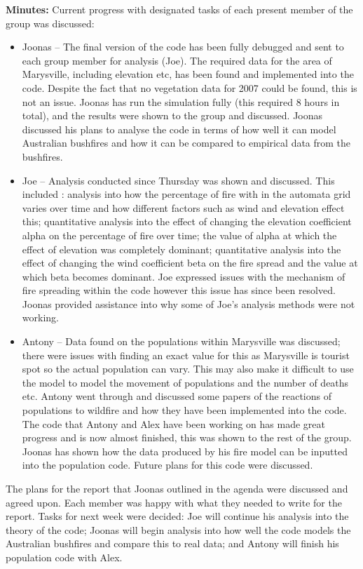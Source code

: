 \textbf{Minutes:}
Current progress with designated tasks of each present member of the group was discussed:
\begin{itemize}
    \item Joonas – The final version of the code has been fully debugged and sent to each group member for analysis (Joe). The required data for the area of Marysville, including elevation etc, has been found and implemented into the code.  Despite the fact that no vegetation data for 2007 could be found, this is not an issue. Joonas has run the simulation fully (this required 8 hours in total), and the results were shown to the group and discussed. Joonas discussed his plans to analyse the code in terms of how well it can model Australian bushfires and how it can be compared to empirical data from the bushfires.
    \item Joe – Analysis conducted since Thursday was shown and discussed. This included : analysis into how the percentage of fire with in the automata grid varies over time and how different factors such as wind and elevation effect this; quantitative analysis into the effect of changing the elevation coefficient alpha on the percentage of fire over time; the value of alpha at which the effect of elevation was completely dominant; quantitative analysis into the effect of changing the wind coefficient beta on the fire spread and the value at which beta becomes dominant. Joe expressed issues with the mechanism of fire spreading within the code however this issue has since been resolved. Joonas provided assistance into why some of Joe’s analysis methods were not working.
    \item Antony – Data found on the populations within Marysville was discussed; there were issues with finding an exact value for this as Marysville is tourist spot so the actual population can vary. This may also make it difficult to use the model to model the movement of populations and the number of deaths etc. Antony went through and discussed some papers of the reactions of populations to wildfire and how they have been implemented into the code. The code that Antony and Alex have been working on has made great progress and is now almost finished, this was shown to the rest of the group. Joonas has shown how the data produced by his fire model can be inputted into the population code. Future plans for this code were discussed.
\end{itemize}

The plans for the report that Joonas outlined in the agenda were discussed and agreed upon. Each member was happy with what they needed to write for the report. Tasks for next week were decided: Joe will continue his analysis into the theory of the code; Joonas will begin analysis into how well the code models the Australian bushfires and compare this to real data; and Antony will finish his population code with Alex.   

